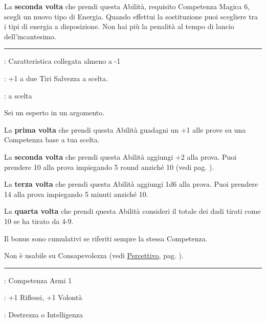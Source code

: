 \begin{multicols}{2}
La \textbf{seconda volta} che prendi questa Abilità, requisito Competenza Magica 6, scegli un nuovo tipo di Energia. Quando effettui la sostituzione puoi scegliere tra i tipi di energia a disposizione. Non hai più la penalità al tempo di lancio dell'incantesimo.

\smallskip\noindent\rule{\linewidth}{2pt} \hypertarget{Esperto}{}\medskip{}
\noindent
\begin{description}[noitemsep, topsep=0pt, parsep=0pt, partopsep=0pt, leftmargin=0cm, labelwidth=2.5cm]
    \item[\textbf{Requisito}]: Caratteristica collegata almeno a -1
    \item[\textbf{Tiri Salvezza}]: +1 a due Tiri Salvezza a scelta.
    \item[\textbf{Caratteristica}]: a scelta
\end{description}

Sei un esperto in un argomento.

La \textbf{prima volta} che prendi questa Abilità guadagni un +1 alle prove su una Competenza base a tua scelta.

La \textbf{seconda volta} che prendi questa Abilità aggiungi +2 alla prova. Puoi prendere 10 alla prova impiegando 5 round anziché 10 (vedi pag. \pageref{prendere10}).

La \textbf{terza volta} che prendi questa Abilità aggiungi 1d6 alla prova. Puoi prendere 14 alla prova impiegando 5 minuti anziché 10.

La \textbf{quarta volta} che prendi questa Abilità consideri il totale dei dadi tirati come 10 se ha tirato da 4-9.

Il bonus sono cumulativi se riferiti sempre la stessa Competenza.

Non è usabile su Consapevolezza (vedi \hyperlink{Percettivo}{Percettivo}, pag. \pageref{Percettivo}).

\smallskip\noindent\rule{\linewidth}{2pt} \hypertarget{Estrazione rapida}{}\medskip{}
\noindent
\begin{description}[noitemsep, topsep=0pt, parsep=0pt, partopsep=0pt, leftmargin=0cm, labelwidth=2.5cm]
    \item[\textbf{Requisito}]: Competenza Armi 1
    \item[\textbf{Tiri Salvezza}]: +1 Riflessi, +1 Volontà
    \item[\textbf{Caratteristica}]: Destrezza o Intelligenza
\end{description}


\end{multicols}
